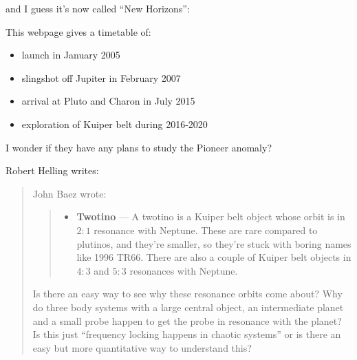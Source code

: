 \documentclass{article}
\def\tightlist{}
\renewcommand{\texttt}[1]{%
  \begingroup
  \ttfamily
  \begingroup\lccode`~=`/\lowercase{\endgroup\def~}{/\discretionary{}{}{}}%
  \begingroup\lccode`~=`[\lowercase{\endgroup\def~}{[\discretionary{}{}{}}%
  \begingroup\lccode`~=`.\lowercase{\endgroup\def~}{.\discretionary{}{}{}}%
  \catcode`/=\active\catcode`[=\active\catcode`.=\active
  \scantokens{#1\noexpand}%
  \endgroup
}
\begin{document}

and I guess it's now called ``New Horizons'':


This webpage gives a timetable of:

\begin{itemize}
\tightlist
\item
  launch in January 2005
\item
  slingshot off Jupiter in February 2007
\item
  arrival at Pluto and Charon in July 2015
\item
  exploration of Kuiper belt during 2016-2020
\end{itemize}

I wonder if they have any plans to study the Pioneer anomaly?

Robert Helling writes:

\begin{quote}
John Baez wrote:

\begin{quote}
\begin{itemize}
\tightlist
\item
  \textbf{Twotino} --- A twotino is a Kuiper belt object whose orbit is
  in \(2:1\) resonance with Neptune. These are rare compared to
  plutinos, and they're smaller, so they're stuck with boring names like
  1996 TR66. There are also a couple of Kuiper belt objects in \(4:3\)
  and \(5:3\) resonances with Neptune.
\end{itemize}
\end{quote}

Is there an easy way to see why these resonance orbits come about? Why
do three body systems with a large central object, an intermediate
planet and a small probe happen to get the probe in resonance with the
planet? Is this just ``frequency locking happens in chaotic systems'' or
is there an easy but more quantitative way to understand this?
\end{quote}
\end{document}
